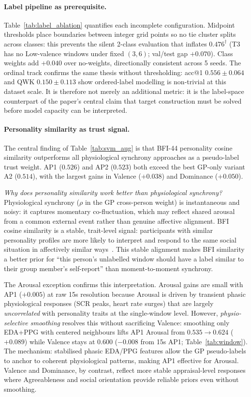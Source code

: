 \documentclass[sigconf,review,anonymous]{acmart}
\begin{document}
\paragraph{Label pipeline as prerequisite.}
Table~\ref{tab:label_ablation} quantifies each incomplete configuration.
Midpoint thresholds place boundaries between integer grid points so no tie
cluster splits across classes: this prevents the silent 2-class evaluation
that inflates $0.476^\dagger$ (T3 has no Low-valence windows under fixed $(3,6)$;
val/test gap $+0.070$).
Class weights add $+0.040$ over no-weights, directionally consistent across 5 seeds.
The ordinal track confirms the same thesis without thresholding: acc@1
$0.556 \pm 0.064$ and QWK $0.150 \pm 0.113$ show ordered-label modelling
is non-trivial at this dataset scale.
It is therefore not merely an additional metric: it is the label-space
counterpart of the paper's central claim that target construction must be
solved before model capacity can be interpreted.

\paragraph{Personality similarity as trust signal.}
The central finding of Table~\ref{tab:svm_aug} is that BFI-44 personality
cosine similarity outperforms all physiological synchrony approaches as a
pseudo-label trust weight.
AP1 ($0.526$) and AP2 ($0.523$) both exceed the best GP-only variant A2 ($0.514$),
with the largest gains in Valence ($+0.038$) and Dominance ($+0.050$).

\textit{Why does personality similarity work better than physiological synchrony?}
Physiological synchrony ($\rho$ in the GP cross-person weight) is instantaneous
and noisy: it captures momentary co-fluctuation, which may reflect shared arousal
from a common external event rather than genuine affective alignment.
BFI cosine similarity is a stable, trait-level signal: participants with similar
personality profiles are more likely to interpret and respond to the same social
situation in affectively similar ways~\cite{hatfield1993emotional,watson1992traits}.
This stable alignment makes BFI similarity a better prior for ``this person's
unlabelled window should have a label similar to their group member's
self-report'' than moment-to-moment synchrony.

The Arousal exception confirms this interpretation.
Arousal gains are small with AP1 ($+0.005$) at raw 15s resolution because
Arousal is driven by transient phasic physiological responses (SCR peaks, heart
rate surges) that are largely \emph{uncorrelated} with personality traits at
the single-window level.
However, \emph{physio-selective smoothing} resolves this without sacrificing
Valence: smoothing only EDA+PPG with centered neighbours lifts AP1 Arousal
from $0.535{\rightarrow}0.624$ ($+0.089$) while Valence stays at $0.600$
($-0.008$ from 15s AP1; Table~\ref{tab:window}).
The mechanism: stabilised phasic EDA/PPG features allow the GP pseudo-labels
to anchor to coherent physiological patterns, making AP1 effective for Arousal.
Valence and Dominance, by contrast, reflect more stable appraisal-level responses
where Agreeableness and social orientation provide reliable priors even without
smoothing.
\end{document}
